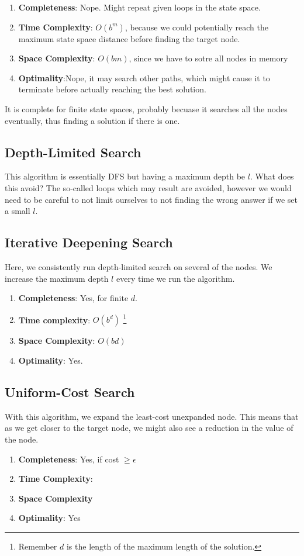\documentclass{tufte-handout}
\begin{document}
\begin{enumerate}
	\item \textbf{Completeness}: Nope. Might repeat given loops in the state space.
	\item \textbf{Time Complexity}: $O(b^{m})$, because we could potentially reach the maximum state space
		distance before finding the target node.
	\item \textbf{Space Complexity}: $O(bm)$, since we have to sotre all nodes in memory
	\item \textbf{Optimality}:Nope, it may search other paths, which might cause it to terminate before
		actually reaching the best solution.
\end{enumerate}
It is complete for finite state spaces, probably becuase it searches all the nodes eventually, thus finding
	a solution if there is one.

\subsection{Depth-Limited Search}
This algorithm is essentially DFS but having a maximum depth be $l$. What does this avoid? 
The so-called loops which may result are avoided, however we would need to be careful to not limit
	ourselves to not finding the wrong answer if we set a small $l$.

\subsection{Iterative Deepening Search}
Here, we consistently run depth-limited search on several of the nodes.
We increase the maximum depth $l$ every time we run the algorithm.

\begin{enumerate}
	\item \textbf{Completeness}: Yes, for finite $d$.
	\item \textbf{Time complexity}: $O(b^{d})$
		\footnote{Remember $d$ is the length of the maximum length of the solution.} 
	\item \textbf{Space Complexity}: $O(bd)$
	\item \textbf{Optimality}: Yes.
\end{enumerate}

\subsection{Uniform-Cost Search}
With this algorithm, we expand the least-cost unexpanded node. 
This means that as we get closer to the target node, we might also see a reduction in the value of the 
	node.
\begin{enumerate}
	\item \textbf{Completeness}: Yes, if cost $\geq\epsilon$
	\item \textbf{Time Complexity}:
	\item \textbf{Space Complexity}
	\item \textbf{Optimality}: Yes
\end{enumerate}
\end{document}
